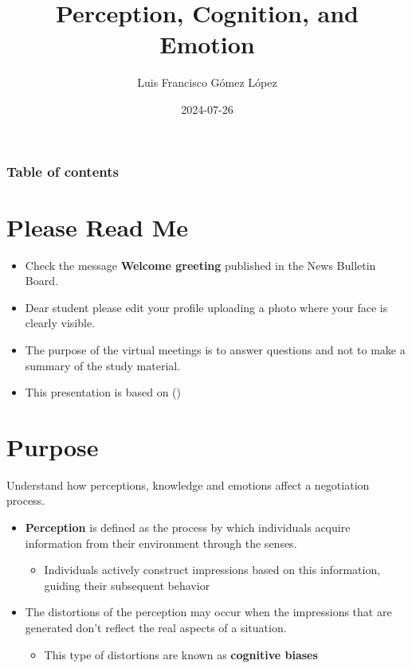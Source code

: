 \documentclass[
  ignorenonframetext,
]{beamer}
\title{Perception, Cognition, and Emotion}
\author{Luis Francisco Gómez López}
\date{2024-07-26}
\institute{FAEDIS}
\providecommand{\tightlist}{%
  \setlength{\itemsep}{0pt}\setlength{\parskip}{0pt}}\usepackage{longtable,booktabs,array}
\renewcommand*\contentsname{Table of contents}
\newcommand\contentsname{Table of contents}
\begin{document}
\frame{\titlepage}

\renewcommand*\contentsname{Table of contents}
\begin{frame}[allowframebreaks]
  \frametitle{Table of contents}
  \tableofcontents[hideallsubsections]
\end{frame}

\section{Please Read Me}\label{please-read-me}

\begin{frame}{}
\label{section}
\begin{itemize}
\item
  Check the message \textbf{Welcome greeting} published in the News
  Bulletin Board.
\item
  Dear student please edit your profile uploading a photo where your
  face is clearly visible.
\item
  The purpose of the virtual meetings is to answer questions and not to
  make a summary of the study material.
\item
  This presentation is based on
  ()
\end{itemize}
\end{frame}

\section{Purpose}\label{purpose}

\begin{frame}{}
\label{section-1}
Understand how perceptions, knowledge and emotions affect a negotiation
process.
\end{frame}

\begin{frame}{}
\label{section-2}
\begin{itemize}
\item
  \textbf{Perception} is defined as the process by which individuals
  acquire information from their environment through the senses.

  \begin{itemize}
  \tightlist
  \item
    Individuals actively construct impressions based on this
    information, guiding their subsequent behavior
  \end{itemize}
\item
  The distortions of the perception may occur when the impressions that
  are generated don't reflect the real aspects of a situation.

  \begin{itemize}
  \tightlist
  \item
    This type of distortions are known as \textbf{cognitive biases}
  \end{itemize}
\end{itemize}
\end{frame}
\end{document}
